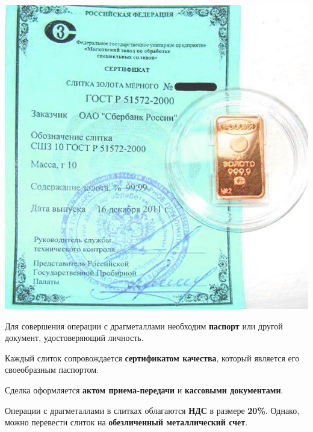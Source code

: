 \documentclass{beamer}
\newcommand{\col}{\textcolor[rgb]{0.2,0.,0.55}}
\begin{document}
		\begin{frame}
\begin{minipage}[h]{0.4\linewidth}
\begin{center}
{\includegraphics[width=1\linewidth]{p/vova.jpg}}
\end{center}
\end{minipage}
\hspace{5pt}
\begin{minipage}[h]{0.5\linewidth}
Для совершения операции с драгметаллами необходим \textbf{паспорт} или другой документ, удостоверяющий личность.

Каждый слиток сопровождается \textbf{\col{сертификатом качества}}, который является его своеобразным паспортом.
\end{minipage}

\vspace{5pt}
\begin{minipage}[h]{1\linewidth} 

Сделка оформляется \textbf{\col{актом приема-передачи}} и \textbf{\col{кассовыми документами}}.

Операции с драгметаллами в слитках облагаются \textbf{НДС} в размере \textbf{\col{20\%}}.
Однако, можно перевести слиток на \textbf{обезличенный металлический счет}.

\end{minipage}
		
		\end{frame}
\end{document}
